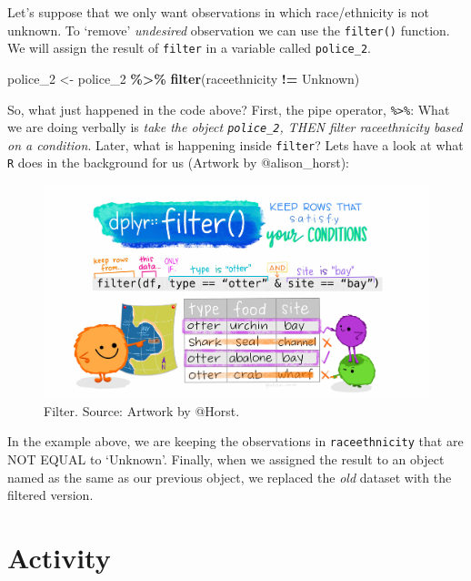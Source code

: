 \documentclass[
]{book}
\newenvironment{Shaded}{\begin{snugshade}}{\end{snugshade}}
\newcommand{\FunctionTok}[1]{\textcolor[rgb]{0.13,0.29,0.53}{\textbf{#1}}}
\newcommand{\NormalTok}[1]{#1}
\newcommand{\OtherTok}[1]{\textcolor[rgb]{0.56,0.35,0.01}{#1}}
\newcommand{\SpecialCharTok}[1]{\textcolor[rgb]{0.81,0.36,0.00}{\textbf{#1}}}
\newcommand{\StringTok}[1]{\textcolor[rgb]{0.31,0.60,0.02}{#1}}
\begin{document}
Let's suppose that we only want observations in which race/ethnicity is not unknown. To `remove' \emph{undesired} observation we can use the \texttt{filter()} function. We will assign the result of \texttt{filter} in a variable called \texttt{police\_2}.

\begin{Shaded}
\begin{Highlighting}[]
\NormalTok{police\_2 }\OtherTok{\textless{}{-}}\NormalTok{ police\_2 }\SpecialCharTok{\%\textgreater{}\%} \FunctionTok{filter}\NormalTok{(raceethnicity }\SpecialCharTok{!=} \StringTok{\textquotesingle{}Unknown\textquotesingle{}}\NormalTok{)}
\end{Highlighting}
\end{Shaded}

So, what just happened in the code above? First, the pipe operator, \texttt{\%\textgreater{}\%}: What we are doing verbally is \emph{take the object \texttt{police\_2}, THEN filter raceethnicity based on a condition}. Later, what is happening inside \texttt{filter}? Lets have a look at what \texttt{R} does in the background for us (Artwork by @alison\_horst):

\begin{figure}

\includegraphics[width=1\linewidth]{./images/lab_2_filter} \hfill{}

\caption{Filter. Source: Artwork by @Horst.}\label{fig:unnamed-chunk-34}
\end{figure}

In the example above, we are keeping the observations in \texttt{raceethnicity} that are NOT EQUAL to `Unknown'. Finally, when we assigned the result to an object named as the same as our previous object, we replaced the \emph{old} dataset with the filtered version.

\hypertarget{activity-3}{%
\section{Activity}\label{activity-3}}
\end{document}

